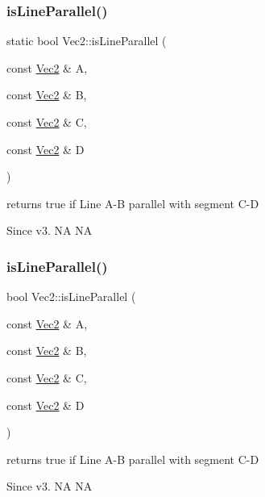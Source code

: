 \subsubsection{\texorpdfstring{is\+Line\+Parallel()}{isLineParallel()}\hspace{0.1cm}{\footnotesize\ttfamily [1/2]}}
{\footnotesize\ttfamily static bool Vec2\+::is\+Line\+Parallel (\begin{DoxyParamCaption}\item[{const \hyperlink{classVec2}{Vec2} \&}]{A,  }\item[{const \hyperlink{classVec2}{Vec2} \&}]{B,  }\item[{const \hyperlink{classVec2}{Vec2} \&}]{C,  }\item[{const \hyperlink{classVec2}{Vec2} \&}]{D }\end{DoxyParamCaption})\hspace{0.3cm}{\ttfamily [static]}}

returns true if Line A-\/B parallel with segment C-\/D \begin{DoxySince}{Since}
v3.  NA  NA 
\end{DoxySince}
\mbox{\label{classVec2_a2fba06dc07b152f9a2efd2687c257035}} 
\subsubsection{\texorpdfstring{is\+Line\+Parallel()}{isLineParallel()}\hspace{0.1cm}{\footnotesize\ttfamily [2/2]}}
{\footnotesize\ttfamily bool Vec2\+::is\+Line\+Parallel (\begin{DoxyParamCaption}\item[{const \hyperlink{classVec2}{Vec2} \&}]{A,  }\item[{const \hyperlink{classVec2}{Vec2} \&}]{B,  }\item[{const \hyperlink{classVec2}{Vec2} \&}]{C,  }\item[{const \hyperlink{classVec2}{Vec2} \&}]{D }\end{DoxyParamCaption})\hspace{0.3cm}{\ttfamily [static]}}

returns true if Line A-\/B parallel with segment C-\/D \begin{DoxySince}{Since}
v3.  NA  NA 
\end{DoxySince}
\mbox{\label{classVec2_a3fad8b882142f8e96c4b50a2a8c5d1a6}} 
